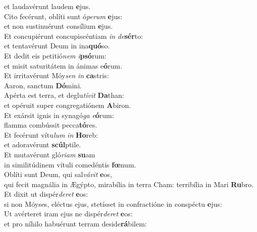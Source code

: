 \oddverse et laudavérunt laudem \textbf{e}jus.\\
\evenverse Cito fecérunt, oblíti sunt ó\textit{pe}\textit{rum} \textbf{e}jus:~\*\\
\evenverse et non sustinuérunt consílium \textbf{e}jus.\\
\oddverse Et concupiérunt concupiscéntiam \textit{in} \textit{de}\textbf{sér}to:~\*\\
\oddverse et tentavérunt Deum in ina\textbf{quó}so.\\
\evenverse Et dedit eis petitió\textit{nem} \textit{i}\textbf{psó}rum:~\*\\
\evenverse et misit saturitátem in ánimas e\textbf{ó}rum.\\
\oddverse Et irritavérunt Móy\textit{sen} \textit{in} \textbf{ca}stris:~\*\\
\oddverse Aaron, sanctum \textbf{Dó}mini.\\
\evenverse Apérta est terra, et deglu\textit{tí}\textit{vit} \textbf{Da}than:~\*\\
\evenverse et opéruit super congregatiónem \textbf{A}biron.\\
\oddverse Et exársit ignis in synagó\textit{ga} \textit{e}\textbf{ó}rum:~\*\\
\oddverse flamma combússit pecca\textbf{tó}res.\\
\evenverse Et fecérunt vítu\textit{lum} \textit{in} \textbf{Ho}reb:~\*\\
\evenverse et adoravérunt \textbf{scúl}ptile.\\
\oddverse Et mutavérunt gló\textit{ri}\textit{am} \textbf{su}am~\*\\
\oddverse in similitúdinem vítuli comedéntis \textbf{fœ}num.\\
\evenverse Oblíti sunt Deum, qui sal\textit{vá}\textit{vit} \textbf{e}os,~\*\\
\evenverse qui fecit magnália in Ægýpto, mirabília in terra Cham: terribília in Mari \textbf{Ru}bro.\\
\oddverse Et dixit ut dispér\textit{de}\textit{ret} \textbf{e}os:~\*\\
\oddverse si non Móyses, eléctus ejus, stetísset in confractióne in conspéctu \textbf{e}jus:\\
\evenverse Ut avérteret iram ejus ne dispér\textit{de}\textit{ret} \textbf{e}os:~\*\\
\evenverse et pro níhilo habuérunt terram deside\textbf{rá}bilem:\\
